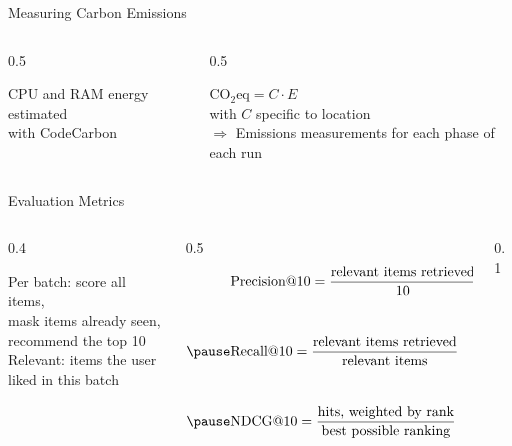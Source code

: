 \begin{frame}{Measuring Carbon Emissions}
    \large
    \begin{columns}
    \begin{column}{0.5\linewidth}
        \vspace{12mm}
        \begin{center}
            CPU and RAM energy estimated\\with CodeCarbon
        \end{center}
    \end{column}
    \begin{column}{0.5\linewidth}
        \vspace{8mm}
        \begin{center}           
        $\text{CO}_2\text{eq} = C \cdot E$\\ with $C$ specific to location \\
        \vspace{6mm}
        $\Rightarrow$ Emissions measurements for each phase of each run
        \end{center}
    \end{column}
    \end{columns}
\end{frame}


\begin{frame}{Evaluation Metrics}
    \large
    \begin{columns}
    \begin{column}{0.4\linewidth}
        \vspace{10mm}
        \begin{center}
            Per batch: score all items,\\mask items already seen,\\recommend the top 10\\
            \vspace{5mm}
            Relevant: items the user\\liked in this batch
        \end{center}
    \end{column}
    \begin{column}{0.5\linewidth}
        \pause
        \begin{align*}
            &\text{Precision@}10 = \frac{\text{relevant items retrieved}}{\text{10}} \\[9mm]
            \pause
            &\text{Recall@}10 = \frac{\text{relevant items retrieved}}{\text{relevant items}} \\[9mm]
            \pause
            &\text{NDCG@}10 = \frac{\text{hits, weighted by rank}}{\text{best possible ranking}}
        \end{align*}
    \end{column}
    \begin{column}{0.1\linewidth}
    \end{column}
    \end{columns}
\end{frame}


